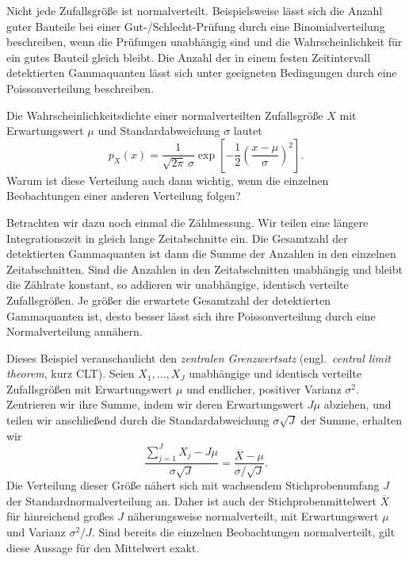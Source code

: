 Nicht jede Zufallsgröße ist normalverteilt. Beispielsweise lässt
sich die Anzahl guter Bauteile bei einer Gut-/Schlecht-Prüfung
durch eine Binomialverteilung beschreiben, wenn die Prüfungen
unabhängig sind und die Wahrscheinlichkeit für ein gutes Bauteil
gleich bleibt. Die Anzahl der in einem festen Zeitintervall
detektierten Gammaquanten lässt sich unter geeigneten Bedingungen
durch eine Poissonverteilung beschreiben.

Die Wahrscheinlichkeitsdichte einer normalverteilten Zufallsgröße
$X$ mit Erwartungswert $\mu$ und Standardabweichung $\sigma$ lautet
\begin{equation}
  p_X(x)
  = \frac{1}{\sqrt{2\pi}\,\sigma}
    \exp\!\left[-\frac{1}{2}
      \left(\frac{x-\mu}{\sigma}\right)^2\right].
\end{equation}
Warum ist diese Verteilung auch dann wichtig, wenn die einzelnen
Beobachtungen einer anderen Verteilung folgen?

Betrachten wir dazu noch einmal die Zählmessung. Wir teilen eine
längere Integrationszeit in gleich lange Zeitabschnitte ein.
Die Gesamtzahl der detektierten Gammaquanten ist dann die Summe
der Anzahlen in den einzelnen Zeitabschnitten. Sind die Anzahlen
in den Zeitabschnitten unabhängig und bleibt die Zählrate konstant,
so addieren wir unabhängige, identisch verteilte Zufallsgrößen.
Je größer die erwartete Gesamtzahl der detektierten Gammaquanten
ist, desto besser lässt sich ihre Poissonverteilung durch eine
Normalverteilung annähern.

Dieses Beispiel veranschaulicht den \textsl{zentralen Grenzwertsatz}
(engl.\ \textsl{central limit theorem}, kurz CLT).
\label{zentralesGrenzwerttheorem}
Seien $X_1,\ldots,X_J$ unabhängige und identisch verteilte
Zufallsgrößen mit Erwartungswert $\mu$ und endlicher, positiver
Varianz $\sigma^2$. Zentrieren wir ihre Summe, indem wir deren
Erwartungswert $J\mu$ abziehen, und teilen wir anschließend durch
die Standardabweichung $\sigma\sqrt{J}$ der Summe, erhalten wir
\begin{equation}
  \frac{\sum_{j=1}^{J}X_j-J\mu}{\sigma\sqrt{J}}
  =\frac{\overline X-\mu}{\sigma/\sqrt{J}}.
\end{equation}
Die Verteilung dieser Größe nähert sich mit wachsendem
Stichprobenumfang $J$ der Standardnormalverteilung an. Daher ist
auch der Stichprobenmittelwert $\overline X$ für hinreichend großes
$J$ näherungsweise normalverteilt, mit Erwartungswert $\mu$ und
Varianz $\sigma^2/J$. Sind bereits die einzelnen Beobachtungen
normalverteilt, gilt diese Aussage für den Mittelwert exakt.

